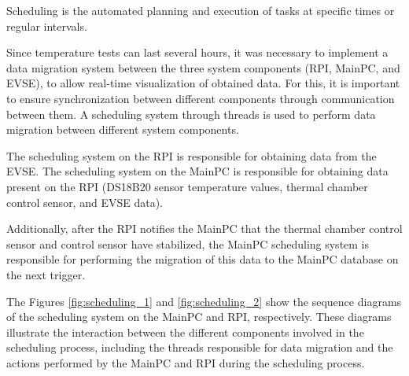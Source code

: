 Scheduling is the automated planning and execution of tasks at specific times or regular intervals.

Since temperature tests can last several hours, it was necessary to implement a data migration system between the three system components (RPI, MainPC, and EVSE), to allow real-time visualization of obtained data. For this, it is important to ensure synchronization between different components through communication between them. A scheduling system through threads is used to perform data migration between different system components.

The scheduling system on the RPI is responsible for obtaining data from the EVSE. The scheduling system on the MainPC is responsible for obtaining data present on the RPI (DS18B20 sensor temperature values, thermal chamber control sensor, and EVSE data).

Additionally, after the RPI notifies the MainPC that the thermal chamber control sensor and control sensor have stabilized, the MainPC scheduling system is responsible for performing the migration of this data to the MainPC database on the next trigger.

The Figures \ref{fig:scheduling_1} and \ref{fig:scheduling_2} show the sequence diagrams of the scheduling system on the MainPC and RPI, respectively. 
These diagrams illustrate the interaction between the different components involved in the scheduling process, including the threads responsible for data migration and the actions performed by the MainPC and RPI during the scheduling process.

